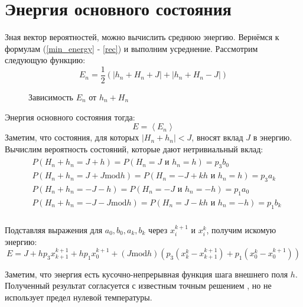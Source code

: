 \section{Энергия основного состояния}
Зная вектор вероятностей, можно вычислить среднюю энергию. Вернёмся к формулам (\ref{min_energy} - \ref{rec}) и выполним усреднение. Рассмотрим следующую функцию:
\begin{equation}
  E_n = \frac 1 2 (|h_n + H_n + J| + |h_n + H_n - J|)
\end{equation}

\begin{figure}
\centering
\caption{Зависимость $E_n$ от $h_n+H_n$}
\end{figure}

Энергия основного состояния тогда:
\begin{equation}
  E = \left< E_n \right>
\end{equation}
Заметим, что состояния, для которых $|H_n + h_n| < J$, вносят вклад $J$ в энергию. Вычислим вероятность состояний, которые дают нетривиальный вклад:
\begin{align}
	\begin{split}
   &P(H_n + h_n = J+h) = P(H_n=J \text{ и } h_n = h) = p_3 b_0\\
   &P(H_n + h_n = J + J \text{mod} h) = P(H_n=-J+kh \text { и } h_n =h)=p_3 a_k\\
   &P(H_n + h_n = -J-h) = P(H_n=-J \text{ и } h_n = -h) = p_1 a_0\\
   &P(H_n + h_n =- J - J \text{mod} h) = P(H_n=J-kh \text{ и } h_n =-h)=p_1 b_k\\
   \end{split}
\end{align}

Подставляя выражения для $a_0, b_0, a_k, b_k$ через $x^{k+1}_i$ и $x^{k}_i$, получим искомую энергию:
\begin{equation}
		E = J + h p_3 x^{k+1}_{k+1}  + h p_1 x^{k+1}_0 + (J \text{mod} h) (p_3 (x^k_k - x^{k+1}_{k+1}) +p_1(x^k_0-x^{k+1}_0))
\end{equation}

Заметим, что энергия есть кусочно-непрерывная функция шага внешнего поля $h$. Полученный результат согласуется с известным точным решением \cite{nieuwenhuizen1986exactly}, но не использует предел нулевой температуры.



\newpage